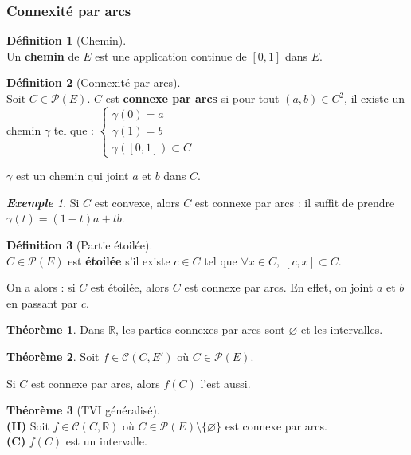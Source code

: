 \documentclass[12pt]{book}
\let\ensembleNombre\mathbb
\newcommand*\R{\ensuremath{\ensembleNombre{R}}}
\theoremstyle{definition}
\newtheorem*{defi}{Définition}
\newtheorem{thme}{Théorème}[chapter]
\theoremstyle{remark}
\newtheorem*{ex}{\textbf{Exemple}}
\newenvironment{fdef}
  {\begin{mdframed}[roundcorner=10pt, linewidth=1pt]\begin{defi}}
  {\end{defi}\end{mdframed}}
\newenvironment{fthme}
  {\begin{mdframed}[roundcorner=10pt, linewidth=2pt]\begin{thme}}
  {\end{thme}\end{mdframed}}
\begin{document}
			\subsubsection{Connexité par arcs}
	\begin{fdef}[Chemin]\mbox{~}\\
	Un \textbf{chemin} de $E$ est une application continue de $[0,1]$ dans $E$.
	\end{fdef}
	
	\begin{fdef}[Connexité par arcs]\mbox{~}\\
	Soit $C \in \mathcal P(E)$. $C$ est \textbf{connexe par arcs} si pour tout $(a,b) \in C^2$, il existe un chemin $\gamma$ tel que : $\begin{cases}
									 \gamma(0) = a \\
									 \gamma(1) = b \\
									 \gamma\left([0,1]\right) \subset C
									 \end{cases}$
									 
	\noindent$\gamma$ est un chemin qui joint $a$ et $b$ dans $C$.
	\end{fdef}
	
	\begin{ex}
	Si $C$ est convexe, alors $C$ est connexe par arcs : il suffit de prendre $\gamma(t) = (1-t)a + tb$.
	\end{ex}

	\begin{fdef}[Partie étoilée]\mbox{~}\\
	$C \in \mathcal P(E)$ est \textbf{étoilée} s'il existe $c \in C$ tel que $\forall x \in C,\; [c,x] \subset C$.
	\end{fdef}
	
	On a alors : si $C$ est étoilée, alors $C$ est connexe par arcs. En effet, on joint $a$ et $b$ en passant par $c$.
	
	\begin{fthme}
	Dans $\R$, les parties connexes par arcs sont $\varnothing$ et les intervalles.
	\end{fthme}
	
	\begin{fthme}
	Soit $f \in \mathcal C(C,E')$ où $C \in \mathcal P(E)$.
	
	Si $C$ est connexe par arcs, alors $f(C)$ l'est aussi.
	\end{fthme}
	
	\begin{fthme}[TVI généralisé]\mbox{~}\\	
	\textbf{(H)} Soit $f \in \mathcal C(C,\R)$ où $C \in \mathcal P(E) \setminus \lbrace \varnothing \rbrace$ est connexe par arcs. \\
	\textbf{(C)} $f(C)$ est un intervalle.
	\end{fthme}
	
\end{document}
